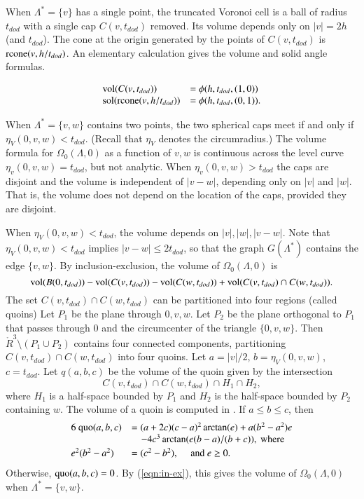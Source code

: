 \documentclass{article} %
\begin{document}
\noindent When $\Lambda^* = \{v\}$ has a single point, the truncated Voronoi
cell is a ball of radius $t_{dod}$
with a single cap $C(v,t_{dod})$ removed.  Its volume depends
only on $|v|=2h$ (and $t_{dod}$).  
The cone at the origin generated by the points of $C(v,t_{dod})$ is
${\operatorname{rcone}}(v,h/t_{dod})$.  An elementary calculation gives the volume and
solid angle formulas.

\begin{equation}  
  \begin{array}{lll}
    {\operatorname{vol}}(C(v,t_{dod})) &= \phi(h,t_{dod},(1,0)) \\
    {\operatorname{sol}}({\operatorname{rcone}}(v,h/t_{dod})) &= \phi(h,t_{dod},(0,1)).\\
  \end{array}
\end{equation}

\noindent When $\Lambda^*=\{v,w\}$ contains two points, the two spherical
caps meet if and only if $\eta_V(0,v,w) < t_{dod}$.  (Recall that
$\eta_V$ denotes the circumradius.)   The volume formula for
$\Omega_0(\Lambda,0)$ as a function of $v,w$ is continuous
across the level curve $\eta_v(0,v,w)=t_{dod}$, but not analytic.
When $\eta_v(0,v,w) > t_{dod}$ the caps are disjoint and the
volume is independent of $|v-w|$, depending only on $|v|$ and $|w|$.
That is, the volume does not depend on the location of the caps,
provided they are disjoint.

When $\eta_V(0,v,w) < t_{dod}$, the volume depends on
$|v|,|w|,|v-w|$.  Note that $\eta_V(0,v,w) < t_{dod}$ implies
$|v-w|\le 2t_{dod}$, so that the graph $G(\Lambda^*)$ contains
the edge $\{v,w\}$.
By inclusion-exclusion, the volume of $\Omega_0(\Lambda,0)$ is
\begin{equation}\label{eqn:in-ex}
  {\operatorname{vol}}(B(0,t_{dod})) - {\operatorname{vol}}(C(v,t_{dod})) - {\operatorname{vol}}(C(w,t_{dod})) +
  {\operatorname{vol}}(C(v,t_{dod}) \cap C(w,t_{dod})).
\end{equation}
The set $C(v,t_{dod})\cap C(w,t_{dod})$ can be partitioned into four
regions (called quoins) Let $P_1$ be the plane through $0,v,w$. Let
$P_2$ be the plane orthogonal to $P_1$ that passes through $0$ and the
circumcenter of the triangle $\{0,v,w\}$. Then $\ring{R}^3\setminus
(P_1\cup P_2)$ contains four connected components, partitioning
$C(v,t_{dod})\cap C(w,t_{dod})$ into four quoins. Let $a=|v|/2$,
$b=\eta_V(0,v,w)$, $c=t_{dod}$. Let $q(a,b,c)$ be the volume of the
quoin given by the intersection
$$C(v,t_{dod})\cap C(w,t_{dod}) \cap H_1 \cap H_2,$$
where $H_1$ is a half-space bounded by $P_1$ and $H_2$ is
the half-space bounded by $P_2$ containing $w$.
The volume of a quoin is computed in \cite[\S7.3]{Hales:2006:DCG}.
If $a\le b\le c$, then 
\begin{equation}
\begin{array}{lll}
6\ {\operatorname{quo}}(a,b,c) &= (a+2c) (c-a)^2 \arctan(e) + a(b^2-a^2) e \\
&\quad - 4c^3 \arctan(e(b-a)/(b+c)),\text{ where}\\ [0.5ex]
e^2 (b^2-a^2)&= (c^2 - b^2), \quad \text{ and } e\ge 0.
\end{array}
\end{equation}
Otherwise, ${\operatorname{quo}}(a,b,c) = 0$.  By (\ref{eqn:in-ex}), this gives
the volume of $\Omega_0(\Lambda,0)$ when $\Lambda^*=\{v,w\}$.
\end{document}
